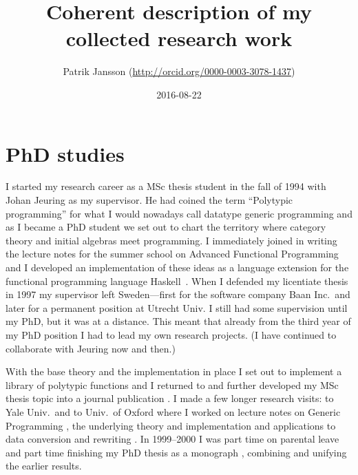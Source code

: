 \documentclass[11pt,twoside,twocolumn]{article}
\title{Coherent description of my collected research work}
\author{Patrik Jansson (\url{http://orcid.org/0000-0003-3078-1437})}
\date{2016-08-22}
\begin{document}
\maketitle

\section{PhD studies}
I started my research career as a MSc thesis student in the fall of
1994 with Johan Jeuring as my supervisor.
%
He had coined the term ``Polytypic programming'' for what I would
nowadays call datatype generic programming and as I became a PhD
student we set out to chart the territory where category theory and
initial algebras meet programming.
%
I immediately joined in writing the lecture notes for the summer
school on Advanced Functional Programming \citep{jeuringjansson-afp}
and I developed an implementation of these ideas as a language
extension for the functional programming language Haskell~\citep{janssonjeuring1997a}.
%
When I defended my licentiate thesis \citep{jansson97a} in 1997 my supervisor
left Sweden---first for the software company Baan Inc.\ and later for a
permanent position at Utrecht Univ.
%
I still had some supervision until my PhD, but it was at a distance.
%
This meant that already from the third year of my PhD position I had
to lead my own research projects.
%
(I have continued to collaborate with Jeuring now and then.)


With the base theory and the implementation in place I set out to
implement a library of polytypic functions
\citep{janssonjeuring-polylib} and I returned to and further developed
my MSc thesis topic into a journal publication
\citep{janssonjeuring-polyunify}.
%
I made a few longer research visits: to Yale Univ.\ and to Univ.\ of Oxford
 where I worked on lecture notes on Generic Programming
\citep{backhouseetal98}, the underlying theory and implementation
\citep{jansson:PolyP2compiler} and applications to data conversion
\citep{janssonjeuringdc} and rewriting
\citep{janssonjeuringWGP00:rewriting}.
%
In 1999--2000 I was part time on parental leave and part time
finishing my PhD thesis as a monograph \citep{jansson-phdthesis}, combining
and unifying the earlier results.
\end{document}
